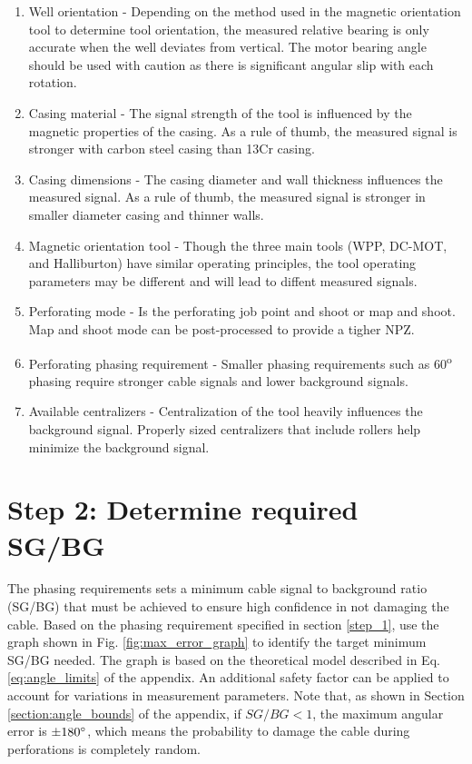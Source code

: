 \documentclass[paper=a4, fontsize=11pt]{scrartcl}
\numberwithin{equation}{section}		%
\numberwithin{figure}{section}			%
\numberwithin{table}{section}				%
\begin{document}
\begin{enumerate}
	\item Well orientation - Depending on the method used in the magnetic orientation tool to determine tool orientation, the measured relative bearing is only accurate when the well deviates from vertical.  The motor bearing angle should be used with caution as there is significant angular slip with each rotation. 
	\item Casing material - The signal strength of the tool is influenced by the magnetic properties of the casing.  As a rule of thumb, the measured signal is stronger with carbon steel casing than 13Cr casing.
	\item Casing dimensions - The casing diameter and wall thickness influences the measured signal.  As a rule of thumb, the measured signal is stronger in smaller diameter casing and thinner walls.
	\item Magnetic orientation tool - Though the three main tools (WPP, DC-MOT, and Halliburton) have similar operating principles, the tool operating parameters may be different and will lead to diffent measured signals.
	\item Perforating mode - Is the perforating job point and shoot or map and shoot.  Map and shoot mode can be post-processed to provide a tigher NPZ.
	\item Perforating phasing requirement - Smaller phasing requirements such as 60\textsuperscript{o} phasing require stronger cable signals and lower background signals.  
	\item Available centralizers - Centralization of the tool heavily influences the background signal.  Properly sized centralizers that include rollers help minimize the background signal.  
\end{enumerate}

\section{Step 2: Determine required SG/BG}\label{section:required_sgbg}
The phasing requirements sets a minimum cable signal to background ratio (SG/BG) that must be achieved to ensure high confidence in not damaging the cable.  Based on the phasing requirement specified in section \ref{step_1}, use the graph shown in Fig. \ref{fig:max_error_graph} to identify the target minimum SG/BG needed.  The graph is based on the theoretical model described in Eq. \ref{eq:angle_limits} of the appendix.  An additional safety factor can be applied to account for variations in measurement parameters.  Note that, as shown in Section \ref{section:angle_bounds} of the appendix, if $SG/BG<1$, the maximum angular error is $\pm180\degree$, which means the probability to damage the cable during perforations is completely random.  
\end{document}
